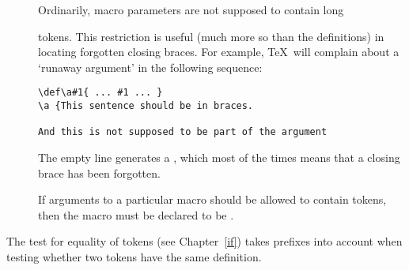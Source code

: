 \begin{description}
\item []
Ordinarily, macro parameters are not supposed to contain
\cstoidx long\par
{} tokens. This restriction is useful (much more so
than the  definitions) in locating
forgotten closing braces. 
For example, \TeX\ will complain about a `runaway argument'
in the following sequence:
\begin{verbatim}
\def\a#1{ ... #1 ... }
\a {This sentence should be in braces.

And this is not supposed to be part of the argument
\end{verbatim}
The empty line generates a , which most of the times
means that a closing brace has been forgotten.

If arguments to a particular macro should be allowed
to contain  tokens,  then the macro must be declared
to be . \end{description}

The  test for equality of tokens 
(see Chapter~\ref{if}) takes prefixes into
account when testing whether two tokens have the same definition.

\begin{comment}
With a little ingenuity it is possible 
for \cs{par} tokens to sneak into macro arguments anyway.
Consider the example
\begin{verbatim}
\def\a#1\par!{ ... }
\a bc\par ef\par!
\end{verbatim}
Here the macro \cs{a} is not \cs{long}, but the argument
is \verb>bc\par ef>, which contains a \cs{par} token.
However,
this is of no importance in general.
\end{comment}

